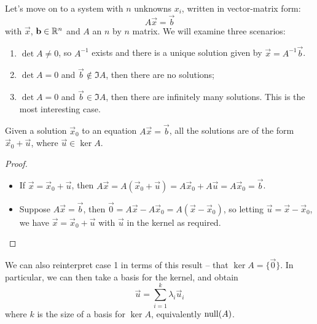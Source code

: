 \documentclass{../../template/note}
\begin{document}
    Let's move on to a system with \(n\) unknowns \(x_i\), written in vector-matrix form:
    \[
        A\vec x = \vec b
    \]
    with \(\vec x\), \(\vec b \in \RR^n\) and \(A\) an \(n\) by \(n\) matrix. We will examine three scenarios:
    \begin{enumerate}[label=\protect\circled{\arabic*}]
        \item \(\det A \neq 0\), so \(A^{-1}\) exists and there is a unique solution given by \(\vec x = A^{-1} \vec b\).
        \item \(\det A = 0\) and \(\vec b \notin \Im A\), then there are no solutions;
        \item \(\det A = 0\) and \(\vec b \in \Im A\), then there are infinitely many solutions. This is the most interesting case.
    \end{enumerate}
    
    \begin{proposition}
        Given a solution \(\vec x_0\) to an equation \(A \vec x = \vec b\), all the solutions are of the form \(\vec x_0 + \vec u\), where \(\vec u \in \ker A\).
    \end{proposition}
    
    \begin{proof}
        \begin{itemize}
            \item[\(\impliedby\)] If \(\vec x = \vec x_0 + \vec u\), then \(A \vec x = A (\vec x_0 + \vec u) = A \vec x_0 + A \vec u = A \vec x_0 = \vec b\).
            \item[\(\implies\)] Suppose \(A \vec x = \vec b\), then \(\vec 0 = A \vec x - A \vec x_0 = A(\vec x - \vec x_0)\), so letting \(\vec u = \vec x - \vec x_0\), we have \(\vec x = \vec x_0 + \vec u\) with \(\vec u\) in the kernel as required.
        \end{itemize}
    \end{proof}
    
    We can also reinterpret case 1 in terms of this result -- that \(\ker A = \{\vec 0\}\). In particular, we can then take a basis for the kernel, and obtain
    \[
        \vec u = \sum_{i=1}^k \lambda_i \vec u_i
    \]
    where \(k\) is the size of a basis for \(\ker A\), equivalently \(\operatorname{null}(A)\).
\end{document}
